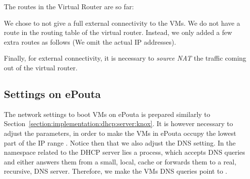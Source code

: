 The routes in the Virtual Router are so far:


We chose to not give a full external connectivity to the VMs. We do
not have a  route in the routing table of the virtual
router. Instead, we only added a few extra routes as follows (We omit
the actual IP addresses).


Finally, for external connectivity, it is necessary to \emph{source
  NAT} the traffic coming out of the virtual router.


\subsection{Settings on ePouta}
\label{section:implementation:epouta}

The network settings to boot VMs on ePouta is prepared similarly to
Section~\ref{section:implementation:dhcp:server:knox}.
%
It is however necessary to adjust the parameters, in order to make the
VMs in ePouta occupy the lowest part of the IP range
.
%
Notice then that we also adjust the DNS setting. In the namespace
related to the DHCP server lies a  process, which accepts
DNS queries and either answers them from a small, local, cache or
forwards them to a real, recursive, DNS server. Therefore, we make the
VMs DNS queries point to .


